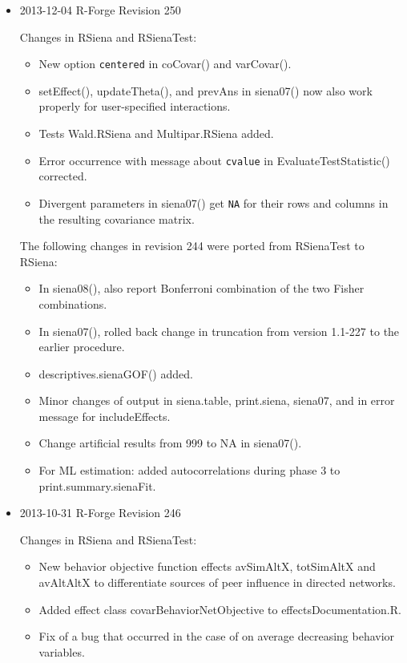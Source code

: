 \documentclass[a4paper,fleqn,11pt]{article}
\newcommand{\+}{\, + \,}
\newcommand{\sfn}[1]{\textsf{#1}}
\begin{document}
\begin{small}
\begin{itemize}
\item 2013-12-04 R-Forge Revision 250

Changes in RSiena and RSienaTest:
\begin{itemize}
\item New option \texttt{centered} in \sfn{coCovar()} and \sfn{varCovar()}.
\item \sfn{setEffect()}, \sfn{updateTheta()}, and \sfn{prevAns} in \sfn{siena07()}
     now also work properly for user-specified interactions.
\item Tests \sfn{Wald.RSiena} and \sfn{Multipar.RSiena} added.
\item Error occurrence with message about \texttt{cvalue} in
      \sfn{EvaluateTestStatistic()} corrected.
\item Divergent parameters in \sfn{siena07()} get \texttt{NA} for their rows and columns
     in the resulting covariance matrix.
\end{itemize}
The following changes in revision 244 were ported from RSienaTest to RSiena:
\begin{itemize}
\item In \sfn{siena08()}, also report Bonferroni combination
     of the two Fisher combinations.
\item In \sfn{siena07()}, rolled back change in truncation from version 1.1-227
     to the earlier procedure.
\item \sfn{descriptives.sienaGOF()} added.
\item Minor changes of output in \sfn{siena.table}, \sfn{print.siena},
    \sfn{siena07}, and in error message for \sfn{includeEffects}.
\item Change artificial results from 999 to NA in \sfn{siena07()}.
\item For ML estimation: added autocorrelations during phase 3
     to \sfn{print.summary.sienaFit}.
\end{itemize}

\item 2013-10-31 R-Forge Revision 246

Changes in RSiena and RSienaTest:
\begin{itemize}
   \item New behavior objective function effects \sfn{avSimAltX}, \sfn{totSimAltX} and
    \sfn{avAltAltX} to differentiate sources of peer influence in directed networks.
   \item Added effect class \sfn{covarBehaviorNetObjective} to \sfn{effectsDocumentation.R}.
   \item Fix of a bug that occurred in the case of on average decreasing behavior variables.
  \end{itemize}


\end{itemize}
\end{small}
\end{document}
